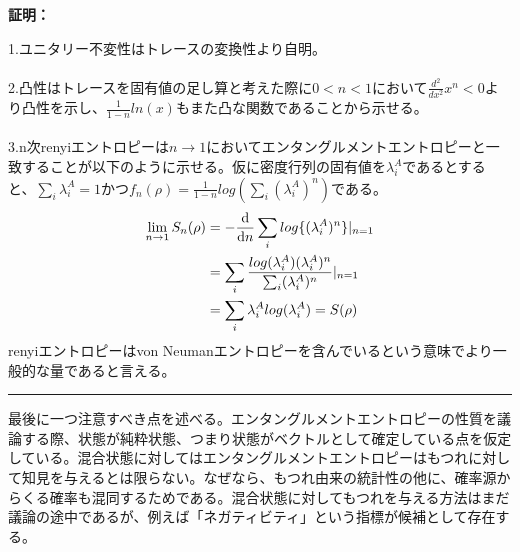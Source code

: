 \documentclass[a4paper,10.5pt]{article}
\numberwithin{equation}{section}
\newenvironment{proofbox}
{\begin{prooflabel}\textbf{証明：}\end{prooflabel}\vspace{0.8em}}
{\par\vspace{1em}\hrule\vspace{1em}}
\begin{document}
\begin{proofbox}
1.ユニタリー不変性はトレースの変換性より自明。\\
\\
2.凸性はトレースを固有値の足し算と考えた際に$0<n<1$において$\frac{d^{2}}{dx^{2}}x^{n}<0$より凸性を示し、$\frac{1}{1-n}ln(x)$もまた凸な関数であることから示せる。\\
\\
3.n次renyiエントロピーは$n\to 1$においてエンタングルメントエントロピーと一致することが以下のように示せる。仮に密度行列の固有値を$\lambda_{i}^{A}$であるとすると、$\sum_{i}\lambda_{i}^{A}=1$かつ$f_{n}(\rho)=\frac{1}{1-n}log(\sum_{i}(\lambda_{i}^{A})^{n})$である。
\begin{equation}\begin{split}
    \lim_{n\to 1} S_{n}(\rho)
    &=-\dv{n}\sum_{i}log\{(\lambda_{i}^{A})^{n}\}|_{n=1}\\
    &=\sum_{i}\frac{log(\lambda_{i}^{A})(\lambda_{i}^{A})^{n}}{\sum_{i}(\lambda_{i}^{A})^{n}}|_{n=1}\\
    &=\sum_{i} \lambda_{i}^{A}log(\lambda_{i}^{A})=S(\rho)
\end{split} \end{equation}
renyiエントロピーはvon Neumanエントロピーを含んでいるという意味でより一般的な量であると言える。\\
\end{proofbox}

最後に一つ注意すべき点を述べる。エンタングルメントエントロピーの性質を議論する際、状態が純粋状態、つまり状態がベクトルとして確定している点を仮定している。混合状態に対してはエンタングルメントエントロピーはもつれに対して知見を与えるとは限らない。なぜなら、もつれ由来の統計性の他に、確率源からくる確率も混同するためである。混合状態に対してもつれを与える方法はまだ議論の途中であるが、例えば「ネガティビティ」という指標が候補として存在する。
\end{document}
